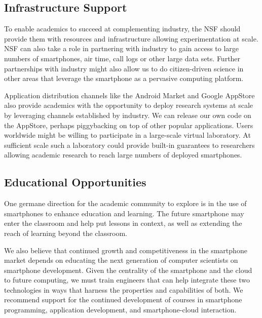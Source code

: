 \subsection{Infrastructure Support}

To enable academics to succeed at complementing industry, the NSF should
provide them with resources and infrastructure allowing experimentation at
scale. NSF can also take a role in partnering with industry to gain access to
large numbers of smartphones, air time, call logs or other large data sets.
Further partnerships with industry might also allow us to do citizen-driven
science in other areas that leverage the smartphone as a pervasive computing
platform.

Application distribution channels like the Android Market and Google AppStore
also provide academics with the opportunity to deploy research systems at
scale by leveraging channels established by industry. We can release our own
code on the AppStore, perhaps piggybacking on top of other popular
applications. Users worldwide might be willing to participate in a
large-scale virtual laboratory. At sufficient scale such a laboratory could
provide built-in guarantees to researchers allowing academic research to
reach large numbers of deployed smartphones.

\subsection{Educational Opportunities}

One germane direction for the academic community to explore is in the use of
smartphones to enhance education and learning. The future smartphone may
enter the classroom and help put lessons in context, as well as extending the
reach of learning beyond the classroom.
 
We also believe that continued growth and competitiveness in the smartphone
market depends on educating the next generation of computer scientists on
smartphone development. Given the centrality of the smartphone and the cloud
to future computing, we must train engineers that can help integrate these
two technologies in ways that harness the properties and capabilities of
both. We recommend support for the continued development of courses in
smartphone programming, application development, and smartphone-cloud
interaction.
